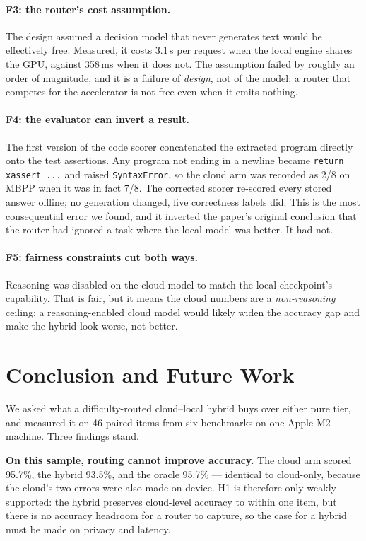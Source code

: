 \documentclass[11pt,a4paper]{article}
\begin{document}
\paragraph{F3: the router's cost assumption.}
The design assumed a decision model that never generates text would be
effectively free. Measured, it costs 3.1\,s per request when the
local engine shares the GPU, against 358\,ms when it does not.
The assumption failed by roughly an order of magnitude, and it is a failure of
\emph{design}, not of the model: a router that competes for the accelerator is
not free even when it emits nothing.

\paragraph{F4: the evaluator can invert a result.}
The first version of the code scorer concatenated the extracted program directly
onto the test assertions. Any program not ending in a newline became
\texttt{return xassert ...} and raised \texttt{SyntaxError}, so the cloud arm
was recorded as 2/8 on MBPP when it was in fact 7/8. The corrected scorer
re-scored every stored answer offline; no generation changed, five correctness
labels did. This is the most consequential error we found, and it inverted the
paper's original conclusion that the router had ignored a task where the local
model was better. It had not.

\paragraph{F5: fairness constraints cut both ways.}
Reasoning was disabled on the cloud model to match the local checkpoint's
capability. That is fair, but it means the cloud numbers are a
\emph{non-reasoning} ceiling; a reasoning-enabled cloud model would likely
widen the accuracy gap and make the hybrid look worse, not better.

\section{Conclusion and Future Work}

We asked what a difficulty-routed cloud--local hybrid buys over either pure
tier, and measured it on 46 paired items from six benchmarks on one
Apple M2 machine. Three findings stand.

\textbf{On this sample, routing cannot improve accuracy.} The cloud arm scored
95.7\%, the hybrid 93.5\%, and the oracle
95.7\% --- identical to cloud-only, because the cloud's two errors
were also made on-device. H1 is therefore only weakly supported: the hybrid
preserves cloud-level accuracy to within one item, but there is no accuracy
headroom for a router to capture, so the case for a hybrid must be made on
privacy and latency.
\end{document}
